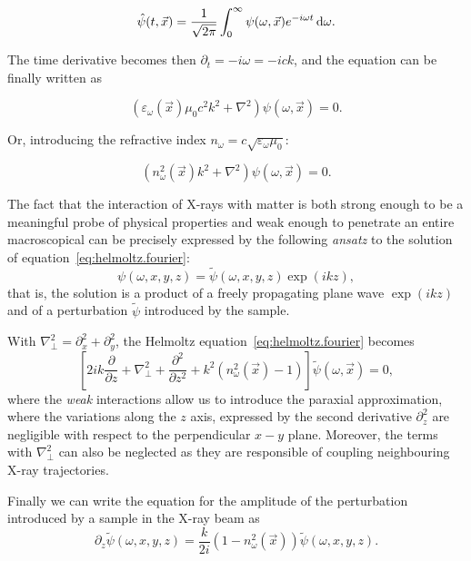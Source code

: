 \begin{equation*}
    \hat{\psi}(t, \vec{x}) =
    \frac{1}{\sqrt{2\pi}}\int_{0}^{\infty}\psi(\omega, \vec{x})
    e^{-i \omega t} \operatorname{d}\!{\omega}.
\end{equation*}

The time derivative becomes then $\partial_t = - i\omega = -i c k$, and the
equation can be finally written as

\begin{equation*}
    \left( \varepsilon_\omega(\vec{x}) \mu_0 c^2 k^2 + \nabla^2
    \right) \psi(\omega, \vec{x}) = 0.
\end{equation*}

Or, introducing the refractive index $n_\omega =
c\sqrt{\varepsilon_\omega\mu_0}$:

\begin{equation}
    \left( n_\omega^2(\vec{x}) k^2 + \nabla^2
    \right) \psi(\omega, \vec{x}) = 0.\label{eq:helmoltz.fourier}
\end{equation}

The fact that the interaction of X-rays with matter is both strong enough to
be a meaningful probe of physical properties and weak enough to penetrate an
entire macroscopical can be precisely expressed by the following
\emph{ansatz} to the solution of equation~\eqref{eq:helmoltz.fourier}:
    \begin{equation*}
 \psi(\omega, x, y, z) = \tilde{\psi}(\omega, x, y, z) \exp(ikz),    
\end{equation*}
that is, the solution is a product of a freely propagating plane wave
$\exp(ikz)$ and of a perturbation $\tilde{\psi}$ introduced by the sample.

With  $\nabla_\perp^2 = \partial_x^2 + \partial_y^2$, the Helmoltz
equation~\eqref{eq:helmoltz.fourier} becomes
\begin{equation*}
    \left[ 2ik \frac{\partial}{\partial z} + \nabla_\perp^2 +
    \frac{\partial^2}{\partial z ^2} + k^2 (n^2_\omega(\vec{x}) - 1)
\right]\tilde{\psi}(\omega, \vec{x}) = 0,
\end{equation*}
where the \emph{weak} interactions allow us to introduce the paraxial
approximation, where the variations along the $z$ axis, expressed by the
second derivative $\partial_z^2$ are negligible with
respect to the perpendicular $x-y$ plane. Moreover, the terms with
$\nabla_\perp^2$ can also be neglected as they are responsible of coupling
neighbouring X-ray trajectories.

Finally we can write the equation for the amplitude of the perturbation introduced by a
sample in the X-ray beam as
\begin{equation}
    \partial_z \tilde{\psi}(\omega, x, y, z) =
    \frac{k}{2i}(1 - n^2_\omega(\vec{x}))\tilde{\psi}(\omega, x, y, z).
    \label{eq:helmoltz.perturbation}
\end{equation}

